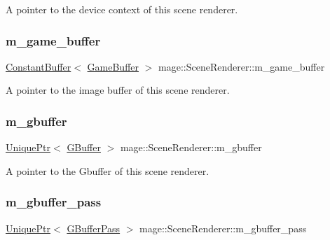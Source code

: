 A pointer to the device context of this scene renderer. \hypertarget{classmage_1_1_scene_renderer_ad684a7211da48953a653fbb95f984fdd}{}\label{classmage_1_1_scene_renderer_ad684a7211da48953a653fbb95f984fdd} 
\subsubsection{\texorpdfstring{m\+\_\+game\+\_\+buffer}{m\_game\_buffer}}
{\footnotesize\ttfamily \hyperlink{structmage_1_1_constant_buffer}{Constant\+Buffer}$<$ \hyperlink{structmage_1_1_game_buffer}{Game\+Buffer} $>$ mage\+::\+Scene\+Renderer\+::m\+\_\+game\+\_\+buffer\hspace{0.3cm}{\ttfamily [private]}}

A pointer to the image buffer of this scene renderer. \hypertarget{classmage_1_1_scene_renderer_ad4a2b9abc762584bd9aceccb5f47b9c4}{}\label{classmage_1_1_scene_renderer_ad4a2b9abc762584bd9aceccb5f47b9c4} 
\subsubsection{\texorpdfstring{m\+\_\+gbuffer}{m\_gbuffer}}
{\footnotesize\ttfamily \hyperlink{namespacemage_a3316d7143a973e37adf1110f2e80ca31}{Unique\+Ptr}$<$ \hyperlink{structmage_1_1_g_buffer}{G\+Buffer} $>$ mage\+::\+Scene\+Renderer\+::m\+\_\+gbuffer\hspace{0.3cm}{\ttfamily [private]}}

A pointer to the Gbuffer of this scene renderer. \hypertarget{classmage_1_1_scene_renderer_a7892cf0b6e53a8d1a5cef1b81353d77a}{}\label{classmage_1_1_scene_renderer_a7892cf0b6e53a8d1a5cef1b81353d77a} 
\subsubsection{\texorpdfstring{m\+\_\+gbuffer\+\_\+pass}{m\_gbuffer\_pass}}
{\footnotesize\ttfamily \hyperlink{namespacemage_a3316d7143a973e37adf1110f2e80ca31}{Unique\+Ptr}$<$ \hyperlink{classmage_1_1_g_buffer_pass}{G\+Buffer\+Pass} $>$ mage\+::\+Scene\+Renderer\+::m\+\_\+gbuffer\+\_\+pass\hspace{0.3cm}{\ttfamily [private]}}

